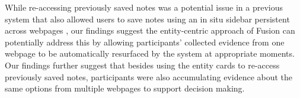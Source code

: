 \noindent While re-accessing previously saved notes was a potential issue in a previous system that also allowed users to save notes using an in situ sidebar persistent across webpages \cite{notetoself}, our findings suggest the entity-centric approach of Fusion can potentially address this by allowing participants' collected evidence from one webpage to be automatically resurfaced by the system at appropriate moments. Our findings further suggest that besides using the entity cards to re-access previously saved notes, participants were also accumulating evidence about the same options from multiple webpages to support decision making.



